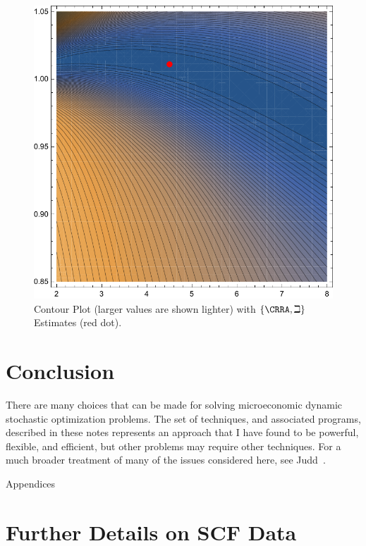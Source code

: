 \documentclass[titlepage, headings=optiontotocandhead]{\econtex}
\begin{document}
\hypertarget{PlotContourMedianStrEst}{}
\begin{figure}
  \includegraphics{./Figures/PlotContourMedianStrEst}
  \caption{Contour Plot (larger values are shown lighter) with $\{\CRRA,{\beth}\}$ Estimates (red dot).}
  \label{fig:PlotContourMedianStrEst}
\end{figure}

\section{Conclusion}

There are many choices that can be made for solving microeconomic dynamic stochastic optimization problems.  The set of techniques, and associated programs, described in these notes represents an approach that I have found to be powerful, flexible, and efficient, but other problems may require other techniques.  For a much broader treatment of many of the issues considered here, see Judd~\citeyearpar{judd:book}.

\clearpage\vfill\eject

\appendix

\centerline{\LARGE Appendices}\vspace{0.2in}

\section{Further Details on SCF Data}\label{app:SCFdata}
\end{document}
